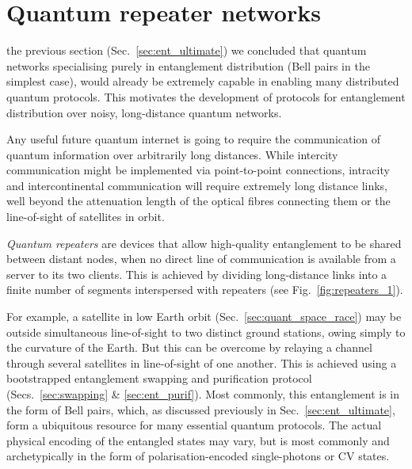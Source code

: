 %
%

\section{Quantum repeater networks} \label{sec:rep_net} 

 the previous section (Sec.~\ref{sec:ent_ultimate}) we concluded that quantum networks specialising purely in entanglement distribution (Bell pairs in the simplest case), would already be extremely capable in enabling many distributed quantum protocols. This motivates the development of protocols for entanglement distribution over noisy, long-distance quantum networks.

Any useful future quantum internet is going to require the communication of quantum information over arbitrarily long distances. While intercity communication might be implemented via point-to-point connections, intracity and intercontinental communication will require extremely long distance links, well beyond the attenuation length of the optical fibres connecting them or the line-of-sight of satellites in orbit.

\textit{Quantum repeaters} \cite{bib:Gisin2007, bib:SSRG09, bib:WJM2015} are devices that allow high-quality entanglement to be shared between distant nodes, when no direct line of communication is available from a server to its two clients. This is achieved by dividing long-distance links into a finite number of segments interspersed with repeaters (see Fig.~\ref{fig:repeaters_1}).

 For example, a satellite in low Earth orbit (Sec.~\ref{sec:quant_space_race}) may be outside simultaneous line-of-sight to two distinct ground stations, owing simply to the curvature of the Earth. But this can be overcome by relaying a channel through several satellites in line-of-sight of one another. This is achieved using a bootstrapped entanglement swapping and purification protocol (Secs.~\ref{sec:swapping} \& \ref{sec:ent_purif}). Most commonly, this entanglement is in the form of Bell pairs, which, as discussed previously in Sec.~\ref{sec:ent_ultimate}, form a ubiquitous resource for many essential quantum protocols. The actual physical encoding of the entangled states may vary, but is most commonly and archetypically in the form of polarisation-encoded single-photons or CV states.
 

